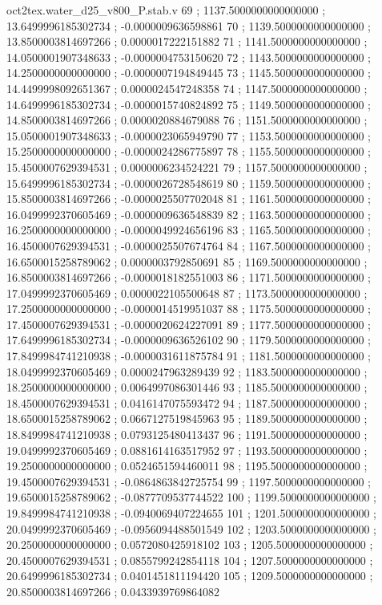 \begin{filecontents}[overwrite]{oct2tex.water_d25_v800_P.stab.v}
69 ; 1137.5000000000000000 ; 13.6499996185302734 ; -0.0000009636598861
70 ; 1139.5000000000000000 ; 13.8500003814697266 ; 0.0000017222151882
71 ; 1141.5000000000000000 ; 14.0500001907348633 ; -0.0000004753150620
72 ; 1143.5000000000000000 ; 14.2500000000000000 ; -0.0000007194849445
73 ; 1145.5000000000000000 ; 14.4499998092651367 ; 0.0000024547248358
74 ; 1147.5000000000000000 ; 14.6499996185302734 ; -0.0000015740824892
75 ; 1149.5000000000000000 ; 14.8500003814697266 ; 0.0000020884679088
76 ; 1151.5000000000000000 ; 15.0500001907348633 ; -0.0000023065949790
77 ; 1153.5000000000000000 ; 15.2500000000000000 ; -0.0000024286775897
78 ; 1155.5000000000000000 ; 15.4500007629394531 ; 0.0000006234524221
79 ; 1157.5000000000000000 ; 15.6499996185302734 ; -0.0000026728548619
80 ; 1159.5000000000000000 ; 15.8500003814697266 ; -0.0000025507702048
81 ; 1161.5000000000000000 ; 16.0499992370605469 ; -0.0000009636548839
82 ; 1163.5000000000000000 ; 16.2500000000000000 ; -0.0000049924656196
83 ; 1165.5000000000000000 ; 16.4500007629394531 ; -0.0000025507674764
84 ; 1167.5000000000000000 ; 16.6500015258789062 ; 0.0000003792850691
85 ; 1169.5000000000000000 ; 16.8500003814697266 ; -0.0000018182551003
86 ; 1171.5000000000000000 ; 17.0499992370605469 ; 0.0000022105500648
87 ; 1173.5000000000000000 ; 17.2500000000000000 ; -0.0000014519951037
88 ; 1175.5000000000000000 ; 17.4500007629394531 ; -0.0000020624227091
89 ; 1177.5000000000000000 ; 17.6499996185302734 ; -0.0000009636526102
90 ; 1179.5000000000000000 ; 17.8499984741210938 ; -0.0000031611875784
91 ; 1181.5000000000000000 ; 18.0499992370605469 ; 0.0000247963289439
92 ; 1183.5000000000000000 ; 18.2500000000000000 ; 0.0064997086301446
93 ; 1185.5000000000000000 ; 18.4500007629394531 ; 0.0416147075593472
94 ; 1187.5000000000000000 ; 18.6500015258789062 ; 0.0667127519845963
95 ; 1189.5000000000000000 ; 18.8499984741210938 ; 0.0793125480413437
96 ; 1191.5000000000000000 ; 19.0499992370605469 ; 0.0881614163517952
97 ; 1193.5000000000000000 ; 19.2500000000000000 ; 0.0524651594460011
98 ; 1195.5000000000000000 ; 19.4500007629394531 ; -0.0864863842725754
99 ; 1197.5000000000000000 ; 19.6500015258789062 ; -0.0877709537744522
100 ; 1199.5000000000000000 ; 19.8499984741210938 ; -0.0940069407224655
101 ; 1201.5000000000000000 ; 20.0499992370605469 ; -0.0956094488501549
102 ; 1203.5000000000000000 ; 20.2500000000000000 ; 0.0572080425918102
103 ; 1205.5000000000000000 ; 20.4500007629394531 ; 0.0855799242854118
104 ; 1207.5000000000000000 ; 20.6499996185302734 ; 0.0401451811194420
105 ; 1209.5000000000000000 ; 20.8500003814697266 ; 0.0433939769864082

\end{filecontents}
